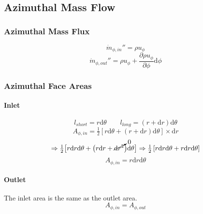 \documentclass[12pt, letterpaper, twoside]{article}
\begin{document}
    \subsection{Azimuthal Mass Flow}
        \subsubsection{Azimuthal Mass Flux}
            \begin{equation}
                \dot{m}_{\phi,in}'' = \rho u_{\phi}
            \end{equation}
            \begin{equation}
                \dot{m}_{\phi,out}'' = \rho u_{\phi}  +
                \frac{\partial \rho u_{\phi}}{\partial \phi} \textrm{d}\phi
            \end{equation}

        \subsubsection{Azimuthal Face Areas}
        \paragraph{Inlet}
            \begin{equation*}
                l_{short} = r \textrm{d}\theta \qquad
                l_{long} = (r + \textrm{d}r) \textrm{d}\theta 
            \end{equation*}
            \begin{equation}\label{eq:Aphi_init}
                A_{\phi,in} = \tfrac{1}{2} \left[r\textrm{d}\theta + \left(r+\textrm{d}r\right)\textrm{d}\theta\right] \times \textrm{d}r
            \end{equation}
            \begin{equation*}
                \Rightarrow
                \tfrac{1}{2} \big[r \textrm{d}r \textrm{d}\theta +  \big(r\textrm{d}r + \cancelto{0}{\textrm{d}r^2}\big) \textrm{d}\theta \big] 
                \Rightarrow
                \tfrac{1}{2} \left[r \textrm{d}r \textrm{d}\theta + r \textrm{d}r \textrm{d}\theta\right]
            \end{equation*}
            \begin{equation}\label{eq:Athetain_final}
                A_{\phi,in} = r \textrm{d}r \textrm{d}\theta
            \end{equation}
        \paragraph{Outlet}
            The inlet area is the same as the outlet area.
            \begin{equation}
                A_{\phi,in} = A_{\phi,out}
            \end{equation}
\end{document}
